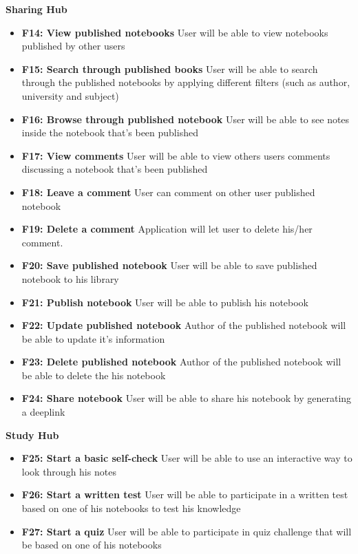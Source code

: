 \documentclass[thesis=B,english]{FITthesis}[2012/10/20]
\begin{document}
\bigskip
\textbf{Sharing Hub}
\begin{itemize}
	\item \textbf{F14: View published notebooks} User will be able to view notebooks published by other users
	\item \textbf{F15: Search through published books} User will be able to search through the published notebooks by applying different filters (such as author, university and subject)
	\item \textbf{F16: Browse through published notebook} User will be able to see notes inside the notebook that's been published
	\item \textbf{F17: View comments} User will be able to view others users comments discussing a notebook that's been published
	\item \textbf{F18: Leave a comment} User can comment on other user published notebook
	\item \textbf{F19: Delete a comment} Application will let user to delete his/her comment.
	\item \textbf{F20: Save published notebook} User will be able to save published notebook to his library
	\item \textbf{F21: Publish notebook} User will be able to publish his notebook
	\item \textbf{F22: Update published notebook} Author of the published notebook will be able to update it's information
	\item \textbf{F23: Delete published notebook} Author of the published notebook will be able to delete the his notebook
	\item \textbf{F24: Share notebook} User will be able to share his notebook by generating a deeplink
 \end{itemize}

\bigskip
\textbf{Study Hub}
\begin{itemize}
	\item \textbf{F25: Start a basic self-check} User will be able to use an interactive way to look through his notes
	\item \textbf{F26: Start a written test} User will be able to participate in a written test based on one of his notebooks to test his knowledge
	\item \textbf{F27: Start a quiz} User will be able to participate in quiz challenge that will be based on one of his notebooks
	
\end{itemize}
\end{document}
